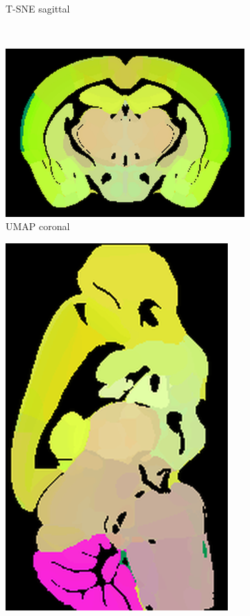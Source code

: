 \documentclass[]{article}
\begin{document}
\begin{figure}
\begin{subfigure}{.176\textwidth}
		\caption{T-SNE sagittal}
		\label{fig:TSNE_sag}
	\end{subfigure}\\

	\begin{subfigure}{.25\textwidth}
		\centering
		\includegraphics[width=.9\linewidth]{../results/umap_ano_coronal_50_res_slice_1.png}
		\caption{UMAP coronal}
		\label{fig:UMAP_cor}
	\end{subfigure}
	\begin{subfigure}{.176\textwidth}
		\centering
		\includegraphics[width=.9\linewidth, angle=270]{../results/umap_ano_sagittal_50_res_slice_1.png}

\end{subfigure}
\end{figure}
\end{document}
